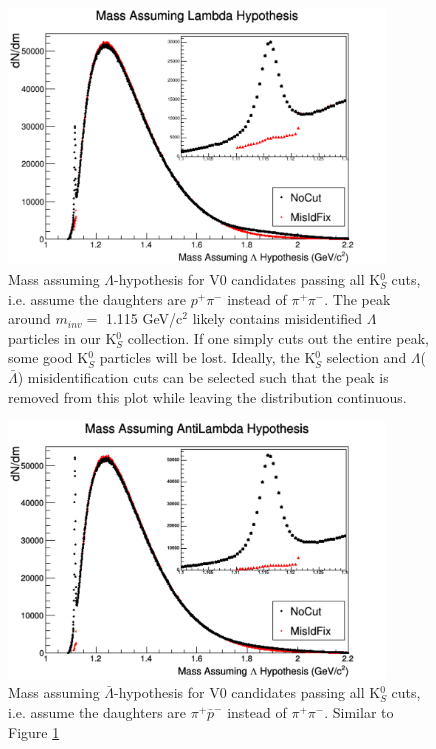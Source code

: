 \begin{figure}[h]
  \centering
  \includegraphics[width=100mm]{3_DataSelection/Figures/MassAssumingLambdaHypothesis.pdf}
  \caption[$\Lambda$ contamination in K$^{0}_{S}$ collection]{Mass assuming $\Lambda$-hypothesis for V0 candidates passing all K$^{0}_{S}$ cuts, i.e. assume the daughters are $p^{+}\pi^{-}$ instead of $\pi^{+}\pi^{-}$.  The peak around $m_{inv} = $ 1.115 GeV/c$^{2}$ likely contains misidentified $\Lambda$ particles in our K$^{0}_{S}$ collection.  If one simply cuts out the entire peak, some good K$^{0}_{S}$ particles will be lost.  Ideally, the K$^{0}_{S}$ selection and $\Lambda$($\bar{\Lambda}$) misidentification cuts can be selected such that the peak is removed from this plot while leaving the distribution continuous.}
  \label{fig:MassAssLamHyp}
\end{figure}

\begin{figure}[h]
  \centering
  \includegraphics[width=100mm]{3_DataSelection/Figures/MassAssumingAntiLambdaHypothesis.pdf}
  \caption[$\bar{\Lambda}$ contamination in K$^{0}_{S}$ collection]{Mass assuming $\bar{\Lambda}$-hypothesis for V0 candidates passing all K$^{0}_{S}$ cuts, i.e. assume the daughters are $\pi^{+}\bar{p}^{-}$ instead of $\pi^{+}\pi^{-}$.  Similar to Figure \ref{fig:MassAssLamHyp}}
  \label{fig:MassAssALamHyp}
\end{figure}

